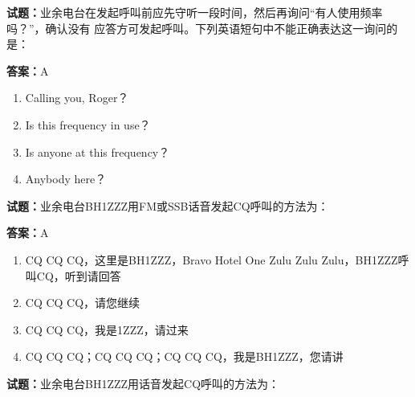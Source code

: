 \documentclass{ctexbook}
\begin{document}




\vspace{1em}

\textbf{试题：}业余电台在发起呼叫前应先守听一段时间，然后再询问“有人使用频率吗？”，确认没有
应答方可发起呼叫。下列英语短句中不能正确表达这一询问的是： 

\textbf{答案：}A 

\begin{enumerate}[leftmargin=3em]
  \item Calling you, Roger？ 

  \item Is this frequency in use？ 

  \item Is anyone at this frequency？ 

  \item Anybody here？ 

\end{enumerate}





\vspace{1em}

\textbf{试题：}业余电台BH1ZZZ用FM或SSB话音发起CQ呼叫的方法为： 

\textbf{答案：}A 

\begin{enumerate}[leftmargin=3em]
  \item CQ CQ CQ，这里是BH1ZZZ，Bravo Hotel One Zulu Zulu Zulu，BH1ZZZ呼叫CQ，听到请回答 

  \item CQ CQ CQ，请您继续 

  \item CQ CQ CQ，我是1ZZZ，请过来 

  \item CQ CQ CQ；CQ CQ CQ；CQ CQ CQ，我是BH1ZZZ，您请讲 

\end{enumerate}






\vspace{1em}

\textbf{试题：}业余电台BH1ZZZ用话音发起CQ呼叫的方法为： 
\end{document}
